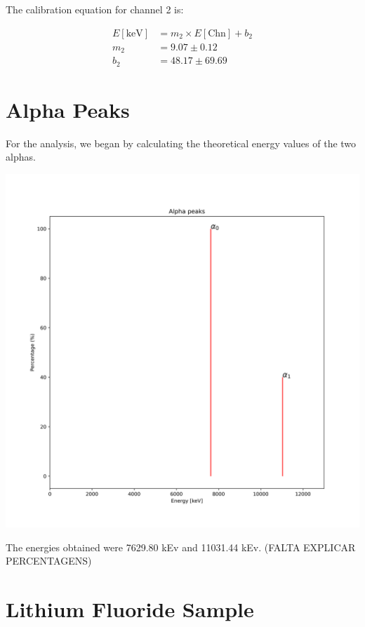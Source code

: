 \documentclass{article}
\begin{document}
\begin{multicols}{2}
The calibration equation for channel 2 is:

\begin{equation}
    \begin{split}
        E[\text{keV}] &= m_2 \times E[\text{Chn}] + b_2 \\
        m_2 &= 9.07 \pm 0.12 \\
        b_2 &= 48.17 \pm 69.69
    \end{split}
    \label{eq:calib2}
\end{equation}

\section{Alpha Peaks}
For the analysis, we began by calculating the theoretical energy values of the two alphas. 

\begin{center}
    \label{alfa_peaks}
    \centering
    \includegraphics[scale = 0.35]{images/AlphaPeaks.png}
\end{center}

The energies obtained were 7629.80 kEv and 11031.44 kEv. (FALTA EXPLICAR PERCENTAGENS)

\section{Lithium Fluoride Sample}


\end{multicols}
\end{document}
